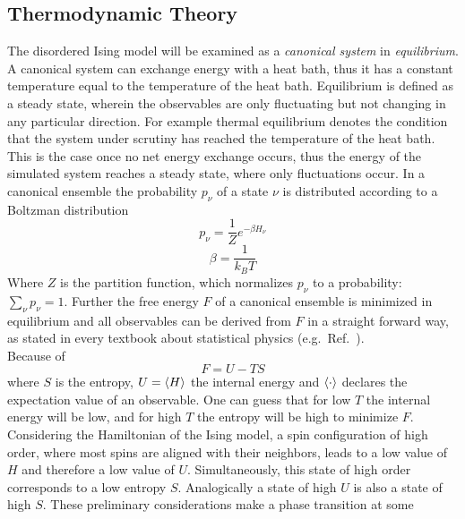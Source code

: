 \subsection{Thermodynamic Theory}
\label{ssec:theory}
    The disordered Ising model will be examined as a \emph{canonical system} in
    \emph{equilibrium}. A canonical system can exchange energy with a
    heat bath, thus it has a constant temperature equal to the temperature of the
    heat bath.
    Equilibrium is defined as a steady state, wherein
    the observables are only fluctuating but not changing in any
    particular direction. For example thermal equilibrium denotes the
    condition that the system under scrutiny has reached the temperature
    of the heat bath. This is the case once no net energy exchange occurs,
    thus the energy of the simulated system reaches a steady state, where
    only fluctuations occur.
    In a canonical ensemble the probability \(p_\nu\) of a state
    \(\nu\) is distributed according to a Boltzman distribution
    \begin{equation}
        p_\nu = \frac{1}{Z} e^{-\beta H_\nu}
    \end{equation}
    \begin{equation}
        \beta = \frac{1}{k_B T}
    \end{equation}
    Where \(Z\) is the partition function, which normalizes \(p_\nu\) to
    a probability: \(\sum_\nu p_\nu = 1\).
    Further the free energy \(F\) of a canonical ensemble is minimized
    in equilibrium and all observables can be derived from \(F\)
    in a straight forward way, as stated in every textbook about
    statistical physics (e.g.\ Ref.\ \cite{nolting2005}).\\
    Because of
    \begin{equation}
        F = U - TS
    \end{equation}
    where \(S\) is the entropy, \(U=\left< H \right>\) the internal energy and
    \(\left< \cdot \right>\) declares the expectation value of an observable.
    One can guess that for low \(T\) the internal energy
    will be low, and for high \(T\) the entropy will be high to minimize
    \(F\).
    Considering the Hamiltonian of the Ising model, a spin configuration
    of high order, where most spins are aligned with their neighbors,
    leads to a low value of \(H\) and therefore a low value of \(U\).
    Simultaneously, this state of high order corresponds to a low entropy \(S\).
    Analogically a state of high \(U\) is also a state of high \(S\).
    These preliminary considerations make a phase transition at some
